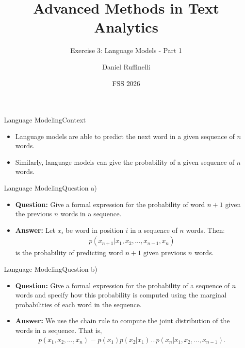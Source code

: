 \documentclass[t]{beamer}
\title[Write your short title here]{Advanced Methods in Text Analytics}
\subtitle{Exercise 3: Language Models - Part 1}
\author{Daniel Ruffinelli}
\institute{University of Mannheim}
\date{FSS 2026}
\begin{document}

\begin{frame}
    \titlepage{}
\end{frame}

\begin{frame}{Language Modeling}{Context}
    \begin{itemize}
        \item Language models are able to predict the next word in a given
              sequence of $n$ words.
        \item Similarly, language models can give the probability of a given
              sequence of $n$ words.
    \end{itemize}
\end{frame}

\begin{frame}{Language Modeling}{Question a)}
    \begin{itemize}
        \item \textbf{Question:} Give a formal expression for the probability of
              word $n+1$ given the previous $n$ words in a sequence.
              \pause
        \item \textbf{Answer:} Let $x_i$ be word in position $i$ in a sequence
              of $n$ words. Then:
              \begin{align*}
                  p(x_{n+1}|x_1, x_2, \ldots, x_{n-1}, x_{n})
              \end{align*}
              is the probability of predicting word $n+1$ given previous $n$
              words.
    \end{itemize}
\end{frame}

\begin{frame}{Language Modeling}{Question b)}
    \begin{itemize}
        \item \textbf{Question:} Give a formal expression for the probability of
              a sequence of $n$ words and specify how this probability is
              computed using the marginal probabilities of each word in the
              sequence.
              \pause
        \item \textbf{Answer:} We use the chain rule to compute the joint
              distribution of the words in a sequence.
              That is,
              \begin{align*}
                  p(x_1, x_2, \ldots, x_n) = p(x_1)p(x_2|x_1)\ldots p(x_n|x_1,x_2,\ldots,x_{n-1}).
              \end{align*}
    \end{itemize}
\end{frame}
\end{document}
